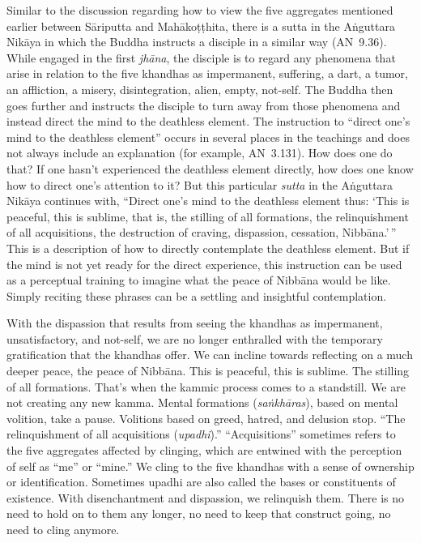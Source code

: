 Similar to the discussion regarding how to view the five aggregates mentioned earlier between Sāriputta and Mahākoṭṭhita, there is a sutta in the Aṅguttara Nikāya in which the Buddha instructs a disciple in a similar way \mbox{(AN 9.36)}. While engaged in the first \emph{jhāna}, the disciple is to regard any phenomena that arise in relation to the five khandhas as impermanent, suffering, a dart, a tumor, an affliction, a misery, disintegration, alien, empty, not-self. The Buddha then goes further and instructs the disciple to turn away from those phenomena and instead direct the mind to the deathless element. The instruction to ``direct one's mind to the deathless element'' occurs in several places in the teachings and does not always include an explanation (for example, \mbox{AN 3.131}). How does one do that? If one hasn't experienced the deathless element directly, how does one know how to direct one's attention to it? But this particular \emph{sutta} in the Aṅguttara Nikāya continues with, ``Direct one's mind to the deathless element thus: `This is peaceful, this is sublime, that is, the stilling of all formations, the relinquishment of all acquisitions, the destruction of craving, dispassion, cessation, Nibbāna.'\,'' This is a description of how to directly contemplate the deathless element. But if the mind is not yet ready for the direct experience, this instruction can be used as a perceptual training to imagine what the peace of Nibbāna would be like. Simply reciting these phrases can be a settling and insightful contemplation.

With the dispassion that results from seeing the khandhas as impermanent, unsatisfactory, and not-self, we are no longer enthralled with the temporary gratification that the khandhas offer. We can incline towards reflecting on a much deeper peace, the peace of Nibbāna. This is peaceful, this is sublime. The stilling of all formations. That's when the kammic process comes to a standstill. We are not creating any new kamma. Mental formations (\emph{saṅkhāras}), based on mental volition, take a pause. Volitions based on greed, hatred, and delusion stop. ``The relinquishment of all acquisitions (\emph{upadhi}).'' ``Acquisitions'' sometimes refers to the five aggregates affected by clinging, which are entwined with the perception of self as ``me'' or ``mine.'' We cling to the five khandhas with a sense of ownership or identification. Sometimes upadhi are also called the bases or constituents of existence. With disenchantment and dispassion, we relinquish them. There is no need to hold on to them any longer, no need to keep that construct going, no need to cling anymore.

